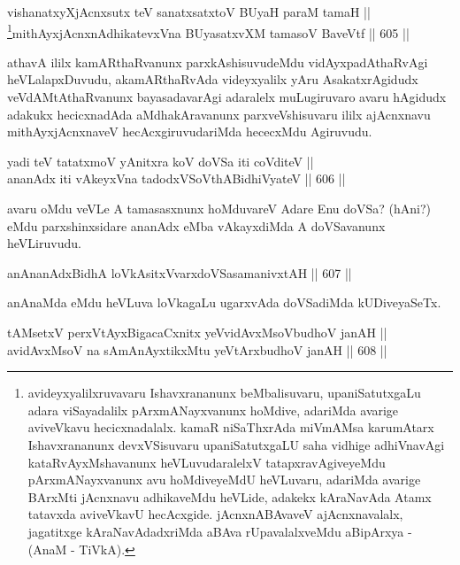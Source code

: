 \begin{shl}
vishanatxyXjAcnxsutx teV sanatxsatxtoV BUyaH paraM tamaH || \\
\footnote{avideyxyalilxruvavaru Ishavxrananunx beMbalisuvaru,
upaniSatutxgaLu adara viSayadalilx pArxmANayxvanunx hoMdive,
adariMda avarige aviveVkavu hecicxnadalalx. kamaR niSaThxrAda
miVmAMsa karumAtarx Ishavxrananunx devxVSisuvaru upaniSatutxgaLU
saha vidhige adhiVnavAgi kataRvAyxMshavanunx heVLuvudaralelxV
tatapxravAgiveyeMdu pArxmANayxvanunx avu hoMdiveyeMdU heVLuvaru,
adariMda avarige BArxMti jAcnxnavu adhikaveMdu heVLide, adakekx
kAraNavAda Atamx tatavxda aviveVkavU hecAcxgide. jAcnxnABAvaveV
ajAcnxnavalalx, jagatitxge kAraNavAdadxriMda aBAva rUpavalalxveMdu
aBipArxya - (AnaM - TiVkA).}mithAyxjAcnxnAdhikatevxVna BUyasatxvXM tamasoV BaveVtf \hfill || 605 ||  
\end{shl}


\begin{artha}
athavA ililx kamARthaRvanunx parxkAshisuvudeMdu vidAyxpadAthaRvAgi
heVLalapxDuvudu, akamARthaRvAda videyxyalilx yAru AsakatxrAgidudx
veVdAMtAthaRvanunx bayasadavarAgi adaralelx  muLugiruvaro avaru
hAgidudx adakukx hecicxnadAda aMdhakAravanunx parxveVshisuvaru ililx
ajAcnxnavu mithAyxjAcnxnaveV hecAcxgiruvudariMda hececxMdu Agiruvudu.
\end{artha}


\begin{shl}
yadi teV tatatxmoV yAnitxra koV doVSa iti coVditeV || \\
ananAdx iti vAkeyxVna tadodxVSoV\s thABidhiVyateV \hfill || 606 ||  
\end{shl}

\begin{artha}
avaru oMdu veVLe A tamasasxnunx hoMduvareV Adare Enu doVSa? (hAni?)
eMdu parxshinxsidare ananAdx eMba vAkayxdiMda A doVSavanunx heVLiruvudu.
\end{artha}

\begin{shl}
anAnanAdxBidhA loVkAsitxVvarxdoVSasamanivxtAH \hfill || 607 || 
\end{shl}

\begin{artha}
anAnaMda eMdu heVLuva loVkagaLu ugarxvAda doVSadiMda kUDiveyaSeTx.
\end{artha}

\begin{shl}
tAMsetxV perxVtAyxBigacaCxnitx yeV\s vidAvxMsoV\s budhoV janAH || \\
avidAvxMsoV na sAmAnAyxtikxMtu yeV\s tArxbudhoV janAH \hfill || 608 || 
\end{shl}

